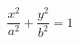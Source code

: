 \documentclass[border=1pt,preview]{standalone}
\begin{document}
$$
  \frac{x^2}{a^2}+\frac{y^2}{b^2}=1 
$$
\end{document}
